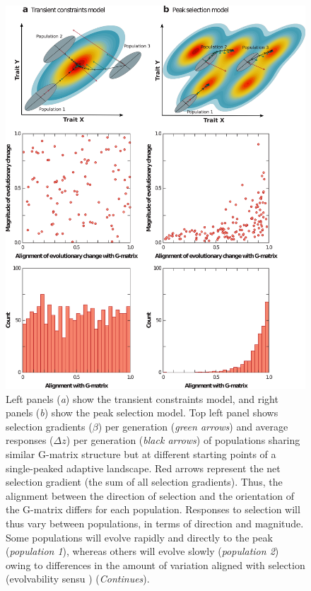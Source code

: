 \begin{refsection}
\begin{figure}[ht]
\includegraphics[width=\linewidth]{chapter_annual_review/media/figure3.png}
\caption[Single peak vs. multiple peak selective landscapes]{Left panels (\emph{a}) show the transient constraints model, and right panels (\emph{b}) show the peak selection model. 
Top left panel shows selection gradients ($\beta$) per generation (\emph{green arrows}) and average responses ($\Delta z$) per generation (\emph{black arrows}) of populations sharing similar G-matrix structure but at different starting points of a single-peaked adaptive landscape. 
Red arrows represent the net selection gradient (the sum of all selection gradients). 
Thus, the alignment between the direction of selection and the orientation of the G-matrix differs for each population. 
Responses to selection will thus vary between populations, in terms of direction and magnitude. 
Some populations will evolve rapidly and directly to the peak (\emph{population 1}), whereas others will evolve slowly (\emph{population 2}) owing to differences in the amount of variation aligned with selection (evolvability sensu \textcite{Hansen2008-kz}) (\emph{Continues}). 
}
\end{figure}
\end{refsection}
